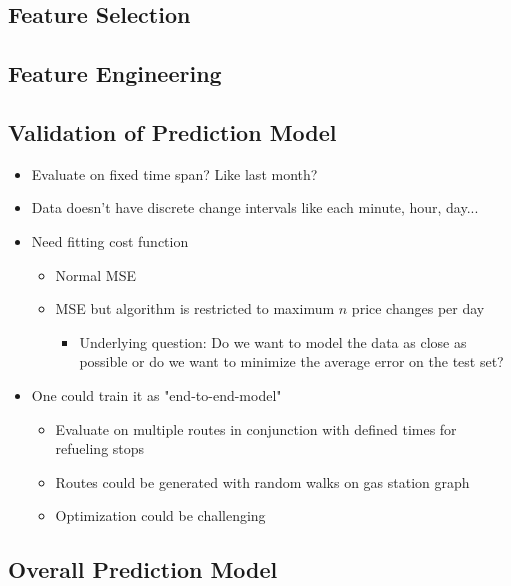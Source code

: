 \documentclass[%
a4paper,
DIV12,
2.5headlines,
bigheadings,
titlepage,
openbib,
]{scrartcl}
\begin{document}
\subsection{Feature Selection}\label{feature-selection}



\subsection{Feature Engineering}\label{feature-engineering}



\subsection{Validation of Prediction
Model}\label{validation-of-prediction-model}
\begin{itemize}
\item Evaluate on fixed time span? Like last month?
\item Data doesn't have discrete change intervals like each minute, hour, day...
\item Need fitting cost function

\begin{itemize}
\item Normal MSE
\item MSE but algorithm is restricted to maximum $n$ price changes per day

\begin{itemize}
\item Underlying question: Do we want to model the data as close as possible or do we want to minimize the average error on the test set?
\end{itemize}
\end{itemize}

\item One could train it as "end-to-end-model"

\begin{itemize}
\item Evaluate on multiple routes in conjunction with defined times for refueling stops
\item Routes could be generated with random walks on gas station graph
\item Optimization could be challenging
\end{itemize}
\end{itemize}


\subsection{Overall Prediction Model}\label{overall-prediction-model}
\end{document}

